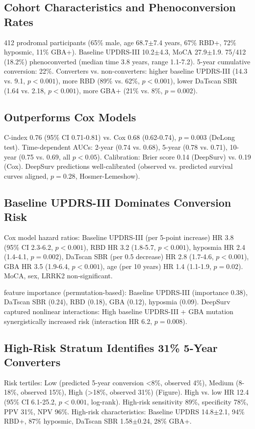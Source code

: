 \subsection{Cohort Characteristics and Phenoconversion Rates}
412 prodromal participants (65\% male, age 68.7$\pm$7.4 years, 67\% RBD+, 72\% hyposmic, 11\% GBA+). Baseline UPDRS-III 10.2$\pm$4.3, MoCA 27.9$\pm$1.9. 75/412 (18.2\%) phenoconverted (median time 3.8 years, range 1.1-7.2). 5-year cumulative conversion: 22\%. Converters vs. non-converters: higher baseline UPDRS-III (14.3 vs. 9.1, $p<0.001$), more RBD (89\% vs. 62\%, $p<0.001$), lower DaTscan SBR (1.64 vs. 2.18, $p<0.001$), more GBA+ (21\% vs. 8\%, $p=0.002$).

\subsection{\deepsurv{} Outperforms Cox Models}
\deepsurv{} C-index 0.76 (95\% CI 0.71-0.81) vs. Cox 0.68 (0.62-0.74), $p=0.003$ (DeLong test). Time-dependent AUCs: 2-year (0.74 vs. 0.68), 5-year (0.78 vs. 0.71), 10-year (0.75 vs. 0.69, all $p<0.05$). Calibration: Brier score 0.14 (DeepSurv) vs. 0.19 (Cox). DeepSurv predictions well-calibrated (observed vs. predicted survival curves aligned, $p=0.28$, Hosmer-Lemeshow).

\subsection{Baseline UPDRS-III Dominates Conversion Risk}
Cox model hazard ratios: Baseline UPDRS-III (per 5-point increase) HR 3.8 (95\% CI 2.3-6.2, $p<0.001$), RBD HR 3.2 (1.8-5.7, $p<0.001$), hyposmia HR 2.4 (1.4-4.1, $p=0.002$), DaTscan SBR (per 0.5 decrease) HR 2.8 (1.7-4.6, $p<0.001$), GBA HR 3.5 (1.9-6.4, $p<0.001$), age (per 10 years) HR 1.4 (1.1-1.9, $p=0.02$). MoCA, sex, LRRK2 non-significant.

\deepsurv{} feature importance (permutation-based): Baseline UPDRS-III (importance 0.38), DaTscan SBR (0.24), RBD (0.18), GBA (0.12), hyposmia (0.09). DeepSurv captured nonlinear interactions: High baseline UPDRS-III + GBA mutation synergistically increased risk (interaction HR 6.2, $p=0.008$).

\subsection{High-Risk Stratum Identifies 31\% 5-Year Converters}
Risk tertiles: Low (predicted 5-year conversion <8\%, observed 4\%), Medium (8-18\%, observed 15\%), High (>18\%, observed 31\%) (Figure). High vs. low HR 12.4 (95\% CI 6.1-25.2, $p<0.001$, log-rank). High-risk sensitivity 89\%, specificity 78\%, PPV 31\%, NPV 96\%. High-risk characteristics: Baseline UPDRS 14.8$\pm$2.1, 94\% RBD+, 87\% hyposmic, DaTscan SBR 1.58$\pm$0.24, 28\% GBA+.

